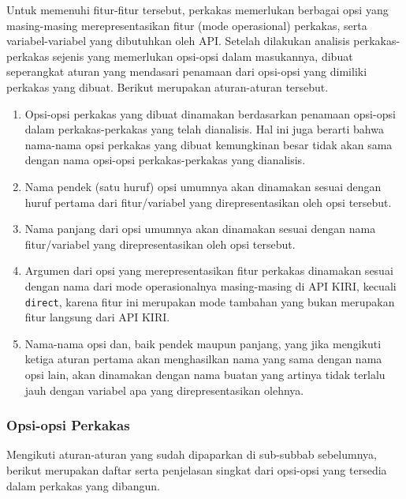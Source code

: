 Untuk memenuhi fitur-fitur tersebut, perkakas memerlukan berbagai opsi yang masing-masing merepresentasikan fitur (mode operasional) perkakas, serta variabel-variabel yang dibutuhkan oleh API. Setelah dilakukan analisis perkakas-perkakas sejenis yang memerlukan opsi-opsi dalam masukannya, dibuat seperangkat aturan yang mendasari penamaan dari opsi-opsi yang dimiliki perkakas yang dibuat. Berikut merupakan aturan-aturan tersebut.

\begin{enumerate}
	\item Opsi-opsi perkakas yang dibuat dinamakan berdasarkan penamaan opsi-opsi dalam perkakas-perkakas yang telah dianalisis. Hal ini juga berarti bahwa nama-nama opsi perkakas yang dibuat kemungkinan besar tidak akan sama dengan nama opsi-opsi perkakas-perkakas yang dianalisis.
	\item Nama pendek (satu huruf) opsi umumnya akan dinamakan sesuai dengan huruf pertama dari fitur/variabel yang direpresentasikan oleh opsi tersebut.
	\item Nama panjang dari opsi umumnya akan dinamakan sesuai dengan nama fitur/variabel yang direpresentasikan oleh opsi tersebut.
	\item Argumen dari opsi yang merepresentasikan fitur perkakas dinamakan sesuai dengan nama dari mode operasionalnya masing-masing di API KIRI, kecuali \texttt{direct}, karena fitur ini merupakan mode tambahan yang bukan merupakan fitur langsung dari API KIRI.
	\item Nama-nama opsi dan, baik pendek maupun panjang, yang jika mengikuti ketiga aturan pertama akan menghasilkan nama yang sama dengan nama opsi lain, akan dinamakan dengan nama buatan yang artinya tidak terlalu jauh dengan variabel apa yang direpresentasikan olehnya.
\end{enumerate}
\vspace*{-0.5em} %
\subsubsection{Opsi-opsi Perkakas}
\label{sec:analysis-thesisapp-features-options}

Mengikuti aturan-aturan yang sudah dipaparkan di sub-subbab sebelumnya, berikut merupakan daftar serta penjelasan singkat dari opsi-opsi yang tersedia dalam perkakas yang dibangun.

